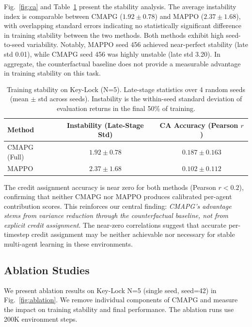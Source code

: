 \documentclass[journal]{IEEEtran}
\begin{document}
Fig.~\ref{fig:ca} and Table~\ref{tab:stability} present the stability analysis. The average instability index is comparable between CMAPG ($1.92 \pm 0.78$) and MAPPO ($2.37 \pm 1.68$), with overlapping standard errors indicating no statistically significant difference in training stability between the two methods. Both methods exhibit high seed-to-seed variability. Notably, MAPPO seed 456 achieved near-perfect stability (late std 0.01), while CMAPG seed 456 was highly unstable (late std 3.20). In aggregate, the counterfactual baseline does not provide a measurable advantage in training stability on this task.

\begin{table}[t]
\centering
\caption{Training stability on Key-Lock (N=5). Late-stage statistics over 4 random seeds (mean $\pm$ std across seeds). Instability is the within-seed standard deviation of evaluation returns in the final 50\% of training.}
\label{tab:stability}
\begin{tabular}{lcc}
\toprule
\textbf{Method} & \textbf{Instability (Late-Stage Std)} & \textbf{CA Accuracy (Pearson $r$)} \\
\midrule
CMAPG (Full)     & $1.92 \pm 0.78$ & $0.187 \pm 0.163$ \\
MAPPO             & $2.37 \pm 1.68$ & $0.102 \pm 0.112$ \\
\bottomrule
\end{tabular}
\end{table}

The credit assignment accuracy is near zero for both methods (Pearson $r < 0.2$), confirming that neither CMAPG nor MAPPO produces calibrated per-agent contribution scores. This reinforces our central finding: \emph{CMAPG's advantage stems from variance reduction through the counterfactual baseline, not from explicit credit assignment}. The near-zero correlations suggest that accurate per-timestep credit assignment may be neither achievable nor necessary for stable multi-agent learning in these environments.

\subsection{Ablation Studies}

We present ablation results on Key-Lock N=5 (single seed, seed=42) in Fig.~\ref{fig:ablation}. We remove individual components of CMAPG and measure the impact on training stability and final performance. The ablation runs use 200K environment steps.
\end{document}
